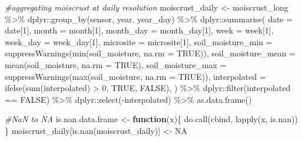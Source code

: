\documentclass[
  table]{article}
\newenvironment{Shaded}{\begin{snugshade}}{\end{snugshade}}
\newcommand{\AttributeTok}[1]{\textcolor[rgb]{0.77,0.63,0.00}{#1}}
\newcommand{\CommentTok}[1]{\textcolor[rgb]{0.56,0.35,0.01}{\textit{#1}}}
\newcommand{\ConstantTok}[1]{\textcolor[rgb]{0.00,0.00,0.00}{#1}}
\newcommand{\ControlFlowTok}[1]{\textcolor[rgb]{0.13,0.29,0.53}{\textbf{#1}}}
\newcommand{\DecValTok}[1]{\textcolor[rgb]{0.00,0.00,0.81}{#1}}
\newcommand{\FunctionTok}[1]{\textcolor[rgb]{0.00,0.00,0.00}{#1}}
\newcommand{\NormalTok}[1]{#1}
\newcommand{\OtherTok}[1]{\textcolor[rgb]{0.56,0.35,0.01}{#1}}
\newcommand{\SpecialCharTok}[1]{\textcolor[rgb]{0.00,0.00,0.00}{#1}}
\begin{document}
\begin{Shaded}
\begin{Highlighting}[]
\CommentTok{\#aggregating moiscrust at daily resolution}
\NormalTok{moiscrust\_daily }\OtherTok{\textless{}{-}}\NormalTok{ moiscrust\_long }\SpecialCharTok{\%\textgreater{}\%} 
\NormalTok{  dplyr}\SpecialCharTok{::}\FunctionTok{group\_by}\NormalTok{(sensor, year, year\_day) }\SpecialCharTok{\%\textgreater{}\%} 
\NormalTok{  dplyr}\SpecialCharTok{::}\FunctionTok{summarise}\NormalTok{(}
    \AttributeTok{date =}\NormalTok{ date[}\DecValTok{1}\NormalTok{],}
    \AttributeTok{month =}\NormalTok{ month[}\DecValTok{1}\NormalTok{],}
    \AttributeTok{month\_day =}\NormalTok{ month\_day[}\DecValTok{1}\NormalTok{],}
    \AttributeTok{week =}\NormalTok{ week[}\DecValTok{1}\NormalTok{],}
    \AttributeTok{week\_day =}\NormalTok{ week\_day[}\DecValTok{1}\NormalTok{],}
    \AttributeTok{microsite =}\NormalTok{ microsite[}\DecValTok{1}\NormalTok{],}
    \AttributeTok{soil\_moisture\_min =} \FunctionTok{suppressWarnings}\NormalTok{(}\FunctionTok{min}\NormalTok{(soil\_moisture, }\AttributeTok{na.rm =} \ConstantTok{TRUE}\NormalTok{)),}
    \AttributeTok{soil\_moisture\_mean =} \FunctionTok{mean}\NormalTok{(soil\_moisture, }\AttributeTok{na.rm =} \ConstantTok{TRUE}\NormalTok{),}
    \AttributeTok{soil\_moisture\_max =} \FunctionTok{suppressWarnings}\NormalTok{(}\FunctionTok{max}\NormalTok{(soil\_moisture, }\AttributeTok{na.rm =} \ConstantTok{TRUE}\NormalTok{)),}
    \AttributeTok{interpolated =} \FunctionTok{ifelse}\NormalTok{(}\FunctionTok{sum}\NormalTok{(interpolated) }\SpecialCharTok{\textgreater{}} \DecValTok{0}\NormalTok{, }\ConstantTok{TRUE}\NormalTok{, }\ConstantTok{FALSE}\NormalTok{),}
\NormalTok{  ) }\SpecialCharTok{\%\textgreater{}\%} 
\NormalTok{  dplyr}\SpecialCharTok{::}\FunctionTok{filter}\NormalTok{(interpolated }\SpecialCharTok{==} \ConstantTok{FALSE}\NormalTok{) }\SpecialCharTok{\%\textgreater{}\%} 
\NormalTok{  dplyr}\SpecialCharTok{::}\FunctionTok{select}\NormalTok{(}\SpecialCharTok{{-}}\NormalTok{interpolated) }\SpecialCharTok{\%\textgreater{}\%} 
  \FunctionTok{as.data.frame}\NormalTok{()}

\CommentTok{\#NaN to NA}
\NormalTok{is.nan.data.frame }\OtherTok{\textless{}{-}} \ControlFlowTok{function}\NormalTok{(x)\{}
  \FunctionTok{do.call}\NormalTok{(cbind, }\FunctionTok{lapply}\NormalTok{(x, is.nan))}
\NormalTok{\}}
\NormalTok{moiscrust\_daily[}\FunctionTok{is.nan}\NormalTok{(moiscrust\_daily)] }\OtherTok{\textless{}{-}} \ConstantTok{NA}


\end{Highlighting}
\end{Shaded}
\end{document}
